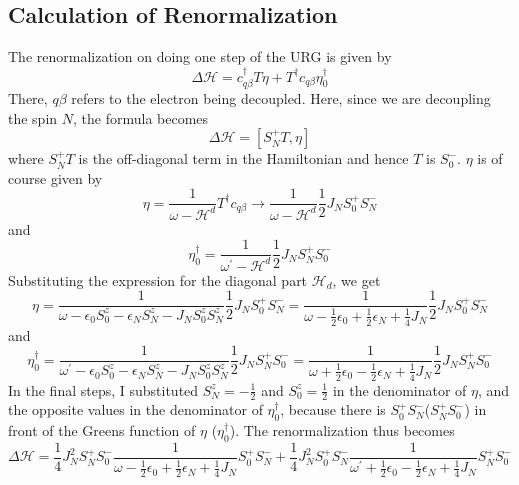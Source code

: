 \documentclass[twoside]{report}
\numberwithin{equation}{section}
\begin{document}
\subsection{Calculation of Renormalization}
The renormalization on doing one step of the URG is given by
\begin{equation}
	\Delta \mathcal{H} = c_{q\beta}^\dagger T \eta + T^\dagger c_{q\beta} \eta_0^\dagger
\end{equation}
There, \(q\beta\) refers to the electron being decoupled. Here, since we are decoupling the spin \(N\), the formula becomes
\begin{equation}
	\Delta \mathcal{H} = \left[S_N^+T,\eta\right]
\end{equation}
where \(S_N^+T\) is the  off-diagonal term in the Hamiltonian and hence \(T\) is  \(S_0^-\). \(\eta\) is of course given by
\begin{equation}
	\eta = \frac{1}{\omega - \mathcal{H}^d}T^\dagger c_{q\beta} \to \frac{1}{\omega - \mathcal{H}^d}\frac{1}{2}J_N S_0^+ S_N^-
\end{equation}
and
\begin{equation}
	\eta_0^\dagger = \frac{1}{\omega^\prime - \mathcal{H}^d}\frac{1}{2}J_N S_N^+ S_0^-
\end{equation}
Substituting the expression for the diagonal part \(\mathcal{H}_d\), we get
\begin{equation}
	\label{stareta}
	\eta  = \frac{1}{\omega - \epsilon_0 S^z_0 - \epsilon_N S^z_N - J_NS^z_0 S^z_N}\frac{1}{2}J_NS_0^+ S_N^- = \frac{1}{\omega - \frac{1}{2}\epsilon_0 + \frac{1}{2}\epsilon_N + \frac{1}{4}J_N}\frac{1}{2}J_NS_0^+ S_N^-
\end{equation}
and
\begin{equation}
	\eta_0^\dagger = \frac{1}{\omega^\prime - \epsilon_0 S^z_0 - \epsilon_N S^z_N - J_NS^z_0 S^z_N}\frac{1}{2}J_NS_N^+ S_0^- = \frac{1}{\omega + \frac{1}{2}\epsilon_0 - \frac{1}{2}\epsilon_N + \frac{1}{4}J_N}\frac{1}{2}J_NS_N^+ S_0^-
\end{equation}
In the final steps, I substituted \(S_N^z = -\frac{1}{2}\) and \(S_0^z = \frac{1}{2}\) in the denominator of \(\eta\), and the opposite values in the denominator of \(\eta_0^\dagger\), because there is \(S_0^+ S_N^-\)(\(S_N^+ S_0^-\)) in front of the Greens function of \(\eta\) (\(\eta_0^\dagger\)). The renormalization thus becomes
\begin{equation}
	\Delta \mathcal{H} = \frac{1}{4}J_N^2 S_N^+S_0^- \frac{1}{\omega - \frac{1}{2}\epsilon_0 + \frac{1}{2}\epsilon_N + \frac{1}{4}J_N}S_0^+ S_N^- + \frac{1}{4}J_N^2S_0^+ S_N^- \frac{1}{\omega^\prime + \frac{1}{2}\epsilon_0 - \frac{1}{2}\epsilon_N + \frac{1}{4}J_N} S_N^+S_0^-
\end{equation}
\end{document}
